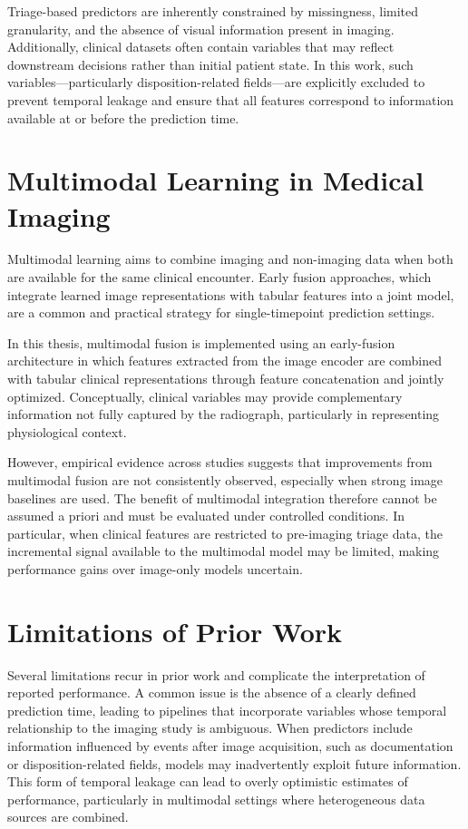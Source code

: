 Triage-based predictors are inherently constrained by missingness, limited granularity, and the absence of visual information present in imaging. Additionally, clinical datasets often contain variables that may reflect downstream decisions rather than initial patient state. In this work, such variables—particularly disposition-related fields—are explicitly excluded to prevent temporal leakage and ensure that all features correspond to information available at or before the prediction time.

\section{Multimodal Learning in Medical Imaging}

Multimodal learning aims to combine imaging and non-imaging data when both are available for the same clinical encounter. Early fusion approaches, which integrate learned image representations with tabular features into a joint model, are a common and practical strategy for single-timepoint prediction settings.

In this thesis, multimodal fusion is implemented using an early-fusion architecture in which features extracted from the image encoder are combined with tabular clinical representations through feature concatenation and jointly optimized. Conceptually, clinical variables may provide complementary information not fully captured by the radiograph, particularly in representing physiological context.

However, empirical evidence across studies suggests that improvements from multimodal fusion are not consistently observed, especially when strong image baselines are used. The benefit of multimodal integration therefore cannot be assumed a priori and must be evaluated under controlled conditions. In particular, when clinical features are restricted to pre-imaging triage data, the incremental signal available to the multimodal model may be limited, making performance gains over image-only models uncertain.

\section{Limitations of Prior Work}

Several limitations recur in prior work and complicate the interpretation of reported performance. A common issue is the absence of a clearly defined prediction time, leading to pipelines that incorporate variables whose temporal relationship to the imaging study is ambiguous. When predictors include information influenced by events after image acquisition, such as documentation or disposition-related fields, models may inadvertently exploit future information. This form of temporal leakage can lead to overly optimistic estimates of performance, particularly in multimodal settings where heterogeneous data sources are combined.

